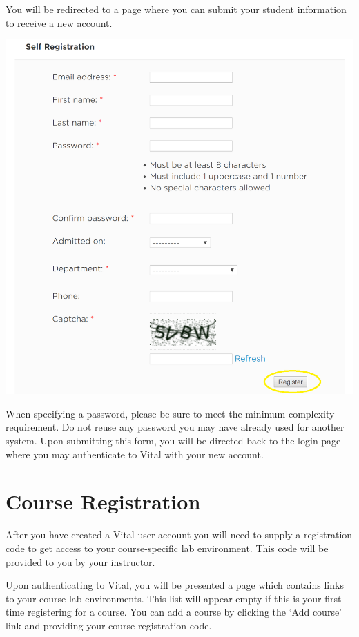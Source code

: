 \documentclass[12pt]{article}
\begin{document}
You will be redirected to a page where you can submit your student information to receive a new account.

{%
\centering
\includegraphics[scale=0.50]{self_registration.png}

}

When specifying a password, please be sure to meet the minimum complexity requirement. Do not reuse any password you may have already used for another system. Upon submitting this form, you will be directed back to the login page where you may authenticate to Vital with your new account.

\section*{Course Registration}
After you have created a Vital user account you will need to supply a registration code to get access to your course-specific lab environment. This code will be provided to you by your instructor.

Upon authenticating to Vital, you will be presented a page which contains links to your course lab environments. This list will appear empty if this is your first time registering for a course. You can add a course by clicking the ‘Add course’ link and providing your course registration code.
 
\end{document}
